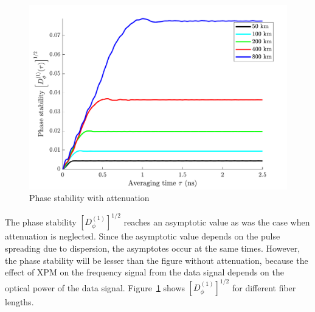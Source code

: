%
\begin{figure}[htb]
	\centering
	\includegraphics[scale=0.9]{img/APhaseStability}
	\caption{Phase stability with attenuation} \label{fig:APhaseStability}
\end{figure}
% 
The phase stability $\left[D^{(1)}_\phi\right]^{1/2}$ reaches an asymptotic value as was the case when attenuation is neglected. Since the asymptotic value depends on the pulse spreading due to dispersion, the asymptotes occur at the same times. However, the phase stability will be lesser than the figure without attenuation, because the effect of XPM on the frequency signal from the data signal depends on the optical power of the data signal. Figure~\ref{fig:APhaseStability} shows $\left[D^{(1)}_\phi\right]^{1/2}$ for different fiber lengths.


